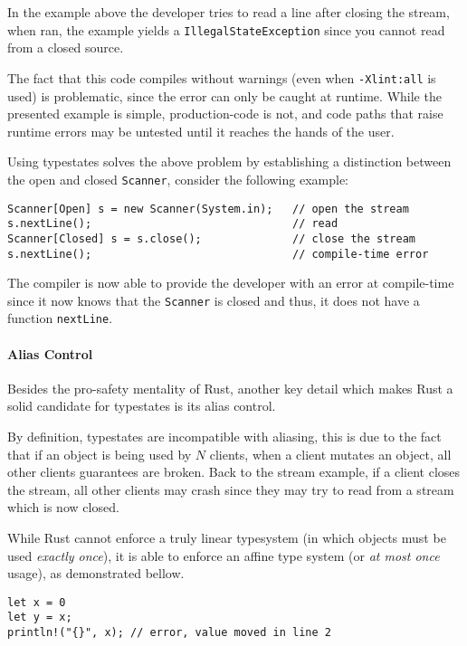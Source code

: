 \documentclass{article}
\begin{document}
In the example above the developer tries to read a line after closing the stream,
when ran, the example yields a \texttt{IllegalStateException} since you cannot read from a closed source.

The fact that this code compiles without warnings (even when \texttt{-Xlint:all} is used) is problematic,
since the error can only be caught at runtime.
While the presented example is simple, production-code is not,
and code paths that raise runtime errors may be untested until it reaches the hands of the user.

Using typestates solves the above problem by establishing a distinction between the open and closed \texttt{Scanner},
consider the following example:

\begin{verbatim}
Scanner[Open] s = new Scanner(System.in);   // open the stream
s.nextLine();                               // read
Scanner[Closed] s = s.close();              // close the stream
s.nextLine();                               // compile-time error
\end{verbatim}

The compiler is now able to provide the developer with an error at compile-time
since it now knows that the \texttt{Scanner} is closed and thus,
it does not have a function \texttt{nextLine}.

\paragraph{Alias Control}

Besides the pro-safety mentality of Rust,
another key detail which makes Rust a solid candidate for typestates is its alias control.

By definition, typestates are incompatible with aliasing,
this is due to the fact that if an object is being used by $N$ clients,
when a client mutates an object, all other clients guarantees are broken.
Back to the stream example, if a client closes the stream,
all other clients may crash since they may try to read from a stream which is now closed.

While Rust cannot enforce a truly linear typesystem (in which objects must be used \emph{exactly once}),
it is able to enforce an affine type system (or \emph{at most once} usage), as demonstrated bellow.


\begin{verbatim}
let x = 0
let y = x;
println!("{}", x); // error, value moved in line 2
\end{verbatim}
\end{document}
